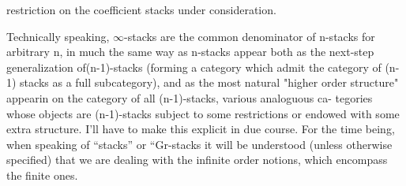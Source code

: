 restriction on the coefficient stacks under consideration.

 Technically speaking, $\infty$-stacks are the
common denominator of n-stacks for arbitrary n, in much the same way as
n-stacks appear both as the next-step generalization of(n-1)-stacks
(forming a category which admit the category of (n-1) stacks as a full
subcategory), and as the most natural "higher order structure" appearin
on the category of all  (n-1)-stacks, \hand{(}  various analoguous ca-
tegories whose objects are (n-1)-stacks subject to some restrictions or
endowed with some extra structure\hand{)}. I'll have to make this explicit in
due course. For the time being, when speaking of ``stacks'' or ``Gr-stacks
it will be understood (unless otherwise specified) that we are dealing
with the infinite order notions, which encompass the finite ones.

